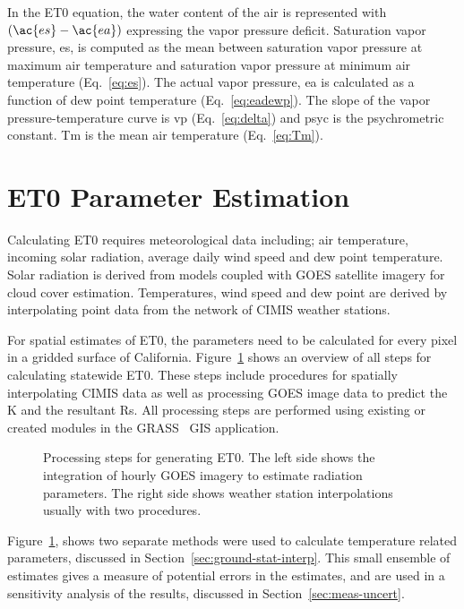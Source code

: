 \documentclass[reviewcopy]{elsart}
\begin{document}
In the \ac{ET0} equation, the water content of the air is represented
with $(\ac{es} - \ac{ea})$ expressing the vapor pressure deficit.
Saturation vapor pressure, \ac{es}, is computed as the mean between
saturation vapor pressure at maximum air temperature and saturation
vapor pressure at minimum air temperature (Eq.~\ref{eq:es}).  The
actual vapor pressure, \ac{ea} is calculated as a function of dew
point temperature (Eq.~\ref{eq:eadewp}).  The slope of the vapor
pressure-temperature curve is \ac{vp} (Eq.~\ref{eq:delta}) and
\ac{psyc} is the psychrometric constant.  \ac{Tm} is the mean air
temperature (Eq.~\ref{eq:Tm}).

\section{\ac{ET0} Parameter Estimation}

Calculating \ac{ET0} requires meteorological data including; air
temperature, incoming solar radiation, average daily wind speed and
dew point temperature. Solar radiation is derived from models coupled
with \ac{GOES} satellite imagery for cloud cover estimation.
Temperatures, wind speed and dew point are derived by interpolating
point data from the network of \ac{CIMIS} weather stations.

For spatial estimates of \ac{ET0}, the parameters need to be
calculated for every pixel in a gridded surface of California.
Figure~\ref{fig:process} shows an overview of all steps for
calculating statewide \ac{ET0}.  These steps include procedures for
spatially interpolating \ac{CIMIS} data as well as processing
\ac{GOES} image data to predict the \acl{K} and the resultant
\acl{Rs}.  All processing steps are performed using existing or
created modules in the \ac{GRASS}~\citep{GRASS_GIS_software,
  neteler04open-sourc-gis} \ac{GIS} application.

\begin{figure}[htbp]
  \centering
  \resizebox{1\textwidth}{!}{}
  \caption{Processing steps for generating \ac{ET0}. The left side shows
    the integration of hourly \ac{GOES} imagery to estimate radiation
    parameters.  The right side shows weather station interpolations
    usually with two procedures.}
\label{fig:process}
\end{figure}

Figure~\ref{fig:process}, shows two separate methods were used to
calculate temperature related parameters, discussed in
Section~\ref{sec:ground-stat-interp}.  This small ensemble of
estimates gives a measure of potential errors in the estimates, and
are used in a sensitivity analysis of the results, discussed in
Section~\ref{sec:meas-uncert}.
\end{document}

